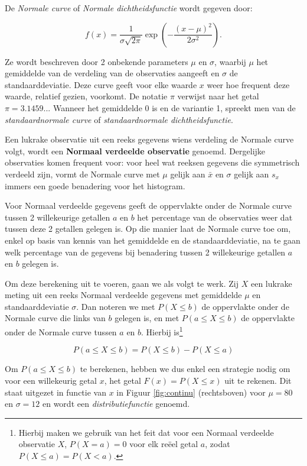 \documentclass[
  12pt,dutch,coursenotes]{book}
\theoremstyle{definition}
\theoremstyle{definition}
\theoremstyle{definition}
\theoremstyle{remark}
\begin{document}
De \emph{Normale curve} of \emph{Normale dichtheidsfunctie} wordt gegeven door:

\begin{equation*}
f(x) = \frac{1}{\sigma \sqrt{2 \pi} } \exp \left ( - \frac{ (x - \mu)^2 }{ 2
\sigma^2} \right ).
\end{equation*}

Ze wordt beschreven door 2 onbekende parameters \(\mu\) en \(\sigma\), waarbij \(\mu\) het gemiddelde van de verdeling van de observaties aangeeft en \(\sigma\)
de standaarddeviatie. Deze curve geeft voor elke waarde \(x\) weer hoe
frequent deze waarde, relatief gezien, voorkomt. De notatie \(\pi\) verwijst
naar het getal \(\pi=3.1459...\) Wanneer het gemiddelde 0 is en de variantie
1, spreekt men van de \emph{standaardnormale curve} of \emph{standaardnormale dichtheidsfunctie}.

Een lukrake observatie uit een reeks gegevens wiens verdeling de Normale
curve volgt, wordt een \textbf{Normaal verdeelde observatie} genoemd.
Dergelijke observaties komen frequent voor: voor heel wat reeksen gegevens
die symmetrisch verdeeld zijn, vormt de Normale curve met \(\mu\) gelijk aan \(\bar x\) en \(\sigma\) gelijk aan \(s_x\) immers een goede benadering voor het
histogram.

Voor Normaal verdeelde gegevens geeft de oppervlakte onder de Normale curve
tussen 2 willekeurige getallen \(a\) en \(b\) het percentage van de
observaties weer dat tussen deze 2 getallen gelegen is. Op die manier laat de
Normale curve toe om, enkel op basis van kennis van het gemiddelde en de
standaarddeviatie, na te gaan welk percentage van de gegevens bij benadering
tussen 2 willekeurige getallen \(a\) en \(b\) gelegen is.

Om deze berekening uit te voeren, gaan we als volgt te werk. Zij \(X\) een
lukrake meting uit een reeks Normaal verdeelde gegevens met gemiddelde \(\mu\)
en standaarddeviatie \(\sigma\). Dan noteren we met \(P(X\leq b)\) de
oppervlakte onder de Normale curve die links van \(b\) gelegen is, en met \(P(a\leq X\leq b)\) de oppervlakte onder de Normale curve tussen \(a\) en \(b\).
Hierbij is\footnote{Hierbij maken we gebruik van het feit dat voor een Normaal verdeelde observatie \(X\), \(P(X=a)=0\) voor elk reëel getal \(a\), zodat \(P(X\leq a)=P(X<a)\).}

\begin{equation*}
P(a\leq X\leq b)=P(X\leq b)-P(X\leq a)
\end{equation*}

Om \(P(a\leq X\leq b)\) te berekenen, hebben we dus enkel een strategie nodig
om voor een willekeurig getal \(x\), het getal \(F(x) = P(X \leq x)\) uit te
rekenen. Dit staat uitgezet in functie van \(x\) in Figuur \ref{fig:continu}
(rechtsboven) voor \(\mu=80\) en \(\sigma=12\) en wordt een \emph{distributiefunctie} genoemd.
\end{document}
